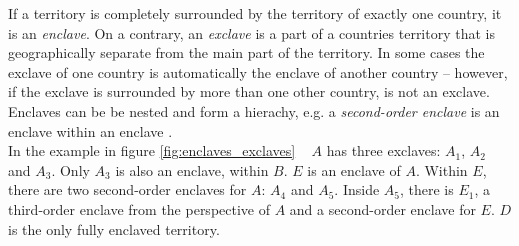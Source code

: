 \begin{minipage}[t]{0.60\textwidth}

If a territory is completely surrounded by the territory of exactly one country, it is an \emph{enclave}. On a contrary, an \emph{exclave} is a part of a countries territory that is geographically separate from the main part of the territory. In some cases the exclave of one country is automatically the enclave of another country -- however, if the exclave is surrounded by more than one other country, is not an exclave. Enclaves can be be nested and form a hierachy, e.g. a \emph{second-order enclave} is an enclave within an enclave
\cite{enclavesexclaves}. \\[-0.6em]

In the example in figure \ref{fig:enclaves_exclaves} ~ $A$ has three exclaves: $A_1$, $A_2$ and $A_3$. Only $A_3$ is also an enclave, within $B$. $E$ is an enclave of $A$. Within $E$, there are two second-order enclaves for $A$: $A_4$ and $A_5$. Inside $A_5$, there is $E_1$, a third-order enclave from the perspective of $A$ and a second-order enclave for $E$. $D$ is the only fully enclaved territory.

\end{minipage}             %
\hspace{0.05\textwidth}    %
